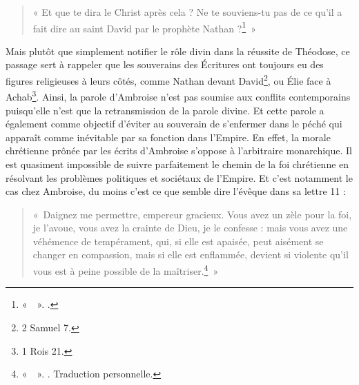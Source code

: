 \bigskip

\begin{quote}
    « Et que te dira le Christ après cela ? Ne te souviens-tu pas de ce qu'il a fait dire au saint David par le prophète Nathan ?\footnote{«~~». \cite[, 22]{ambroise_lettres}.}~»
\end{quote}

\bigskip

Mais plutôt que simplement notifier le rôle divin dans la réussite de Théodose, ce passage sert à rappeler que les souverains des Écritures ont toujours eu des figures religieuses à leurs côtés, comme Nathan devant David\footnote{2 Samuel 7.}, ou Élie face à Achab\footnote{1 Rois 21.}. Ainsi, la parole d'Ambroise n'est pas soumise aux conflits contemporains puisqu'elle n'est que la retransmission de la parole divine. Et cette parole a également comme objectif d'éviter au souverain de s'enfermer dans le péché qui apparaît comme inévitable par sa fonction dans l'Empire. En effet, la morale chrétienne prônée par les écrits d'Ambroise s'oppose à l'arbitraire monarchique. Il est quasiment impossible de suivre parfaitement le chemin de la foi chrétienne en résolvant les problèmes politiques et sociétaux de l'Empire. Et c'est notamment le cas chez Ambroise, du moins c'est ce que semble dire l'évêque dans sa lettre  11 :

\bigskip

\begin{quote}
    «~Daignez me permettre, empereur gracieux. Vous avez un zèle pour la foi, je l’avoue, vous avez la crainte de Dieu, je le confesse : mais vous avez une véhémence de tempérament, qui, si elle est apaisée, peut aisément se changer en compassion, mais si elle est enflammée, devient si violente qu’il vous est à peine possible de la maîtriser.\footnote{«~~». \cite[\nopp ec 11, 4]{ambroise_csel_82_3}. Traduction personnelle.}~»
\end{quote}

\bigskip

